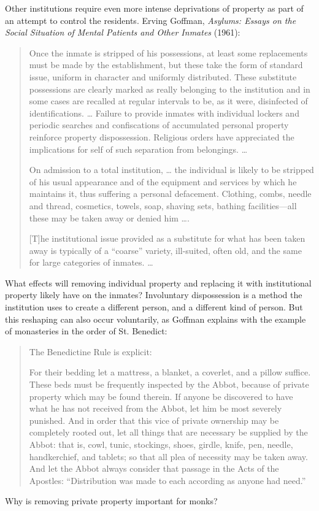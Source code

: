 Other institutions require even more intense deprivations of property as part of
an attempt to control the residents.  Erving Goffman, \emph{Asylums: Essays on
the Social Situation of Mental Patients and Other Inmates} (1961):
\begin{quotation}
Once the inmate is stripped of his possessions, at least some replacements must
be made by the establishment, but these take the form of standard issue,
uniform in character and uniformly distributed. These substitute possessions
are clearly marked as really belonging to the institution and in some cases are
recalled at regular intervals to be, as it were, disinfected of
identifications. {\dots} Failure to provide inmates with individual lockers and
periodic searches and confiscations of accumulated personal property reinforce
property dispossession. Religious orders have appreciated the implications for
self of such separation from belongings. {\dots}

On admission to a total institution, {\dots} the individual is likely to be
stripped of his usual appearance and of the equipment and services by which he
maintains it, thus suffering a personal defacement. Clothing, combs, needle and
thread, cosmetics, towels, soap, shaving sets, bathing facilities---all
these may be taken away or denied him {\dots}.

[T]he institutional issue provided as a substitute for what has been taken away
is typically of a ``coarse'' variety, ill-suited, often old, and the same for
large categories of inmates. {\dots}
\end{quotation}

What effects will removing individual property and replacing it with
institutional property likely have on the inmates?  Involuntary dispossession
is a method the institution uses to create a different person, and a different
kind of person.  But this reshaping can also occur voluntarily, as Goffman
explains with the example of monasteries in the order of St. Benedict:

\begin{quotation}
The Benedictine Rule is explicit: 

For their bedding let a mattress, a blanket, a coverlet, and a pillow suffice.
These beds must be frequently inspected by the Abbot, because of private
property which may be found therein. If anyone be discovered to have what he
has not received from the Abbot, let him be most severely punished. And in
order that this vice of private ownership may be completely rooted out, let all
things that are necessary be supplied by the Abbot: that is, cowl, tunic,
stockings, shoes, girdle, knife, pen, needle, handkerchief, and tablets; so
that all plea of necessity may be taken away. And let the Abbot always consider
that passage in the Acts of the Apostles: ``Distribution was made to each
according as anyone had need.''
\end{quotation}
Why is removing private property important for monks?  

